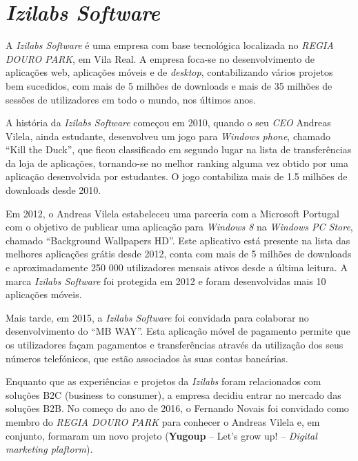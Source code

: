 \section{\textit{Izilabs Software}}

\hspace{1cm}A \textit{Izilabs Software} é uma empresa com base tecnológica localizada no \textit{REGIA DOURO PARK}, em Vila Real. A empresa foca-se no desenvolvimento de aplicações web, aplicações móveis e de \textit{desktop}, contabilizando vários projetos bem sucedidos, com mais de 5 milhões de downloads e mais de 35 milhões de sessões de utilizadores em todo o mundo, nos últimos anos.

\hspace{1cm}A história da \textit{Izilabs Software} começou em 2010, quando o seu \textit{CEO} Andreas Vilela, ainda estudante, desenvolveu um jogo para \textit{Windows phone}, chamado ``Kill the Duck'', que ficou classificado em segundo lugar na lista de transferências da loja de aplicações, tornando-se no melhor ranking alguma vez obtido por uma aplicação desenvolvida por estudantes. O jogo contabiliza mais de 1.5 milhões de downloads desde 2010.

\hspace{1cm}Em 2012, o Andreas Vilela estabeleceu uma parceria com a Microsoft Portugal com o objetivo de publicar uma aplicação para \textit{Windows 8} na \textit{Windows PC Store}, chamado ``Background Wallpapers HD''. Este aplicativo está presente na lista das melhores aplicações grátis desde 2012, conta com mais de 5 milhões de downloads e aproximadamente 250 000 utilizadores mensais ativos desde a última leitura. A marca \textit{Izilabs Software} foi protegida em 2012 e foram desenvolvidas mais 10 aplicações móveis.

\hspace{1cm}Mais tarde, em 2015, a \textit{Izilabs Software} foi convidada para colaborar no desenvolvimento do ``MB WAY''. Esta aplicação móvel de pagamento permite que os utilizadores façam pagamentos e transferências através da utilização dos seus números telefónicos, que estão associados às suas contas bancárias.

\hspace{1cm}Enquanto que as experiências e projetos da \textit{Izilabs} foram relacionados com soluções B2C (business to consumer), a empresa decidiu entrar no mercado das soluções B2B. No começo do ano de 2016, o Fernando Novais foi convidado como membro do \textit{REGIA DOURO PARK} para conhecer o Andreas Vilela e, em conjunto, formaram um novo projeto (\textbf{Yugoup} -- Let's grow up! -- \textit{Digital marketing plaftorm}).

